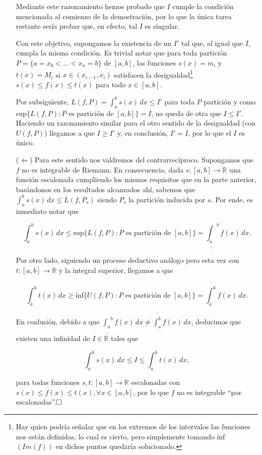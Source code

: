 \documentclass{article}
\begin{document}
\begin{itemize}
    Mediante este razonamiento hemos probado que $I$ cumple la condición mencionada al comienzo de la demostración, por lo que la única tarea restante sería probar que, en efecto, tal $I$ es singular.

    Con este objetivo, supongamos la existencia de un $I'$ tal que, al igual que $I$, cumpla la misma condición. Es trivial notar que para toda partición $P = \{a = x_0 < ... < x_n = b\}$ de $[a, b]$, las funciones $s(x) = m_i$ y $t(x) = M_i$ si $x \in (x_{i - 1}, x_i)$ satisfacen la desigualdad\footnote{Hay quien podría señalar que en los extremos de los intervalos las funciones nos están definidas, lo cual es cierto, pero simplemente tomando ínf$(Im(f))$ en dichos puntos quedaría solucionado.} $s(x) \leq f(x) \leq t(x)$ para todo $x \in [a, b]$.

    Por subsiguiente, $L(f, P) = \int_{a}^{b} s(x) \,dx \leq I'$ para toda $P$ partición y como sup$\{L(f, P) : P \text{ es partición de } [a, b]\} = I$, no queda de otra que $I \leq I'$. Haciendo un razonamiento similar para el otro sentido de la desigualdad (con $U(f, P)$) llegamos a que $I \geq I'$ y, en conclusión, $I' = I$, por lo que el $I$ es único.

    \newpage

    \item[($\Longleftarrow$)] Para este sentido nos valdremos del contrarrecíproco. Supongamos que $f$ no es integrable de Riemann. En consecuencia, dada $s : [a, b] \longrightarrow \mathbb{R}$ una función escalonada cumpliendo los mismos requisitos que en la parte anterior, basándonos en los resultados alcanzados ahí, sabemos que $\int_{a}^{b} s(x) \,dx \leq L(f, P_s)$ siendo $P_s$ la partición inducida por $s$. Por ende, es inmediato notar que 

    \[\int_{a}^{b} s(x) \,dx \leq \text{sup}\{L(f, P) : P \text{ es partición de $[a, b]$}\} = \underline{\int_{a}}^{b} f(x) \,dx.\]

    Por otro lado, siguiendo un proceso deductivo análogo pero esta vez con $t : [a, b] \longrightarrow \mathbb{R}$ y la integral superior, llegamos a que 

    \[\int_{a}^{b} t(x) \,dx \geq \text{ínf}\{U(f, P) : P \text{ es partición de $[a, b]$}\} = \overline{\int_{a}^{b}} f(x) \,dx.\]

    En conlusión, debido a que $\underline{\int_{a}}^{b} f(x) \,dx \neq \overline{\int_{a}^{b}} f(x) \,dx$, deducimos que existen una infinidad de $I \in \mathbb{R}$ tales que 

    \[\int_{a}^{b} s(x) \,dx \leq I \leq \int_{a}^{b} t(x) \,dx,\]

    para todas funciones $s, t : [a, b] \longrightarrow \mathbb{R}$ escalonadas con $s(x) \leq f(x) \leq t(x), \forall x \in [a, b]$, por lo que $f$ no es integrable ``por escalonadas''.$\hfill\square$

\end{itemize}
\end{document}
